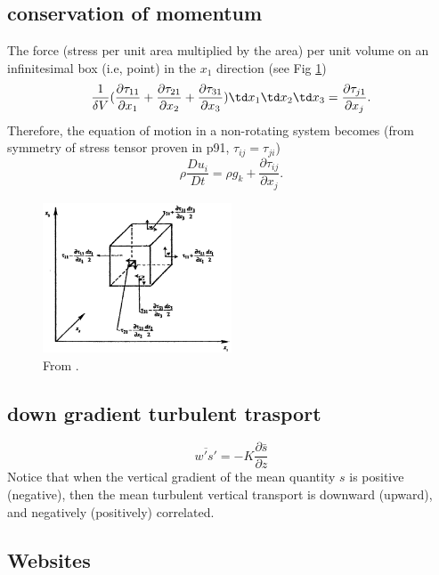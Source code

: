 \subsection{conservation of momentum}
\begin{defn*}
The force (stress per unit area multiplied by the area) per unit volume on an infinitesimal box
(i.e, point) in the $x_1$ direction (see Fig \ref{fig:stress})
%
\begin{equation}
   \frac{1}{\delta V}( \frac{\partial \tau_{11}}{\partial x_1} +  
   \frac{\partial \tau_{21}}{\partial x_2} +
   \frac{\partial \tau_{31}}{\partial x_3} )\td x_1 \td x_2 \td x_3 = 
   \frac{\partial \tau_{j1}}{\partial x_j}.
\end{equation}
%
Therefore, the equation of motion in a non-rotating system becomes (from symmetry of stress tensor
proven in \cite{kundu2008fluid} p91, $\tau_{ij}=\tau_{ji}$)
%
\begin{equation}
   \boxed{ 
      \rho \frac{D u_i}{Dt} = \rho g_k  + \frac{\partial \tau_{ij}}{\partial x_j}.
   }
\end{equation}
%
%
\begin{figure}[H] 
   \includegraphics[width=0.5\textwidth,height=0.4\textwidth]{stress.png} 
   \caption{\label{fig:stress} From \cite{kundu2008fluid}.  } 
\end{figure}
%
\end{defn*}


\subsection{down gradient turbulent trasport}
\begin{defn*}
%
\begin{equation}
   \overline{w's'} = - K \frac{\partial \bar{s}}{\partial z}
\end{equation}
%
Notice that when the vertical gradient of the mean quantity $s$ is positive (negative), then the
mean turbulent vertical transport is downward (upward), and negatively (positively) correlated.
\end{defn*}

























\subsection{Websites}


